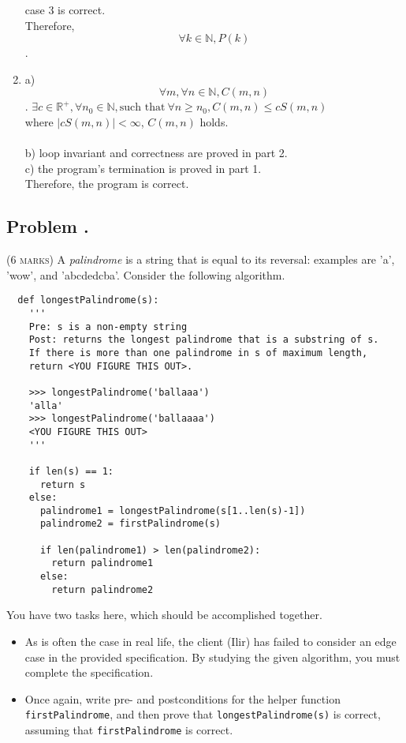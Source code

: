 \documentclass[12pt]{article}
\newcounter{ProblemNum}
\renewcommand{\theProblemNum}{\arabic{ProblemNum}}
\newcommand*{\anyproblem}[1]{\newpage\subsection*{#1}}
\newcommand*{\problem}[1]{\stepcounter{ProblemNum} %
\anyproblem{Problem \theProblemNum. \; #1}}
\begin{document}
\begin{enumerate}
case 3 is correct.\\
Therefore, $$\forall k\in \mathbb{N}, P(k)$$.
\item
a) $$\forall m, \forall n \in \mathbb{N}, C(m,n)$$.
$\exists c\in \mathbb{R}^+, \forall n_0 \in \mathbb{N}, \text{such that}\  \forall n \geq n_0, C(m,n) \leq cS(m,n)$\\
where  $|cS(m,n)| < \infty $, $C(m,n)$ holds.\\\\
b) loop invariant and correctness are proved in part 2.\\
c) the program's termination is proved in part 1.\\
Therefore, the program is correct.

\end{enumerate}





\problem{}
\textsc{(6 marks)} 
 A \emph{palindrome} is a string that is equal to its reversal: examples are 'a', 'wow', and 'abcdedcba'. Consider the following algorithm.
  
  \begin{small}
  \begin{verbatim}
  def longestPalindrome(s):
    ''' 
    Pre: s is a non-empty string
    Post: returns the longest palindrome that is a substring of s.
    If there is more than one palindrome in s of maximum length, 
    return <YOU FIGURE THIS OUT>.
 
    >>> longestPalindrome('ballaaa')
    'alla'
    >>> longestPalindrome('ballaaaa')
    <YOU FIGURE THIS OUT>
    '''
    
    if len(s) == 1:
      return s
    else:
      palindrome1 = longestPalindrome(s[1..len(s)-1])
      palindrome2 = firstPalindrome(s)
      
      if len(palindrome1) > len(palindrome2):
        return palindrome1
      else:
        return palindrome2
  \end{verbatim}
  \end{small}
  
  You have two tasks here, which should be accomplished together.
  \begin{itemize}
    \item As is often the case in real life, the client (Ilir) has failed to consider an edge case in the provided specification. By studying the given algorithm, you must complete the specification.
    \item Once again, write pre- and postconditions for the helper function \texttt{firstPalindrome}, and then prove that \texttt{longestPalindrome(s)} is correct, assuming that \texttt{firstPalindrome} is correct.
  \end{itemize}
  
\end{document}
